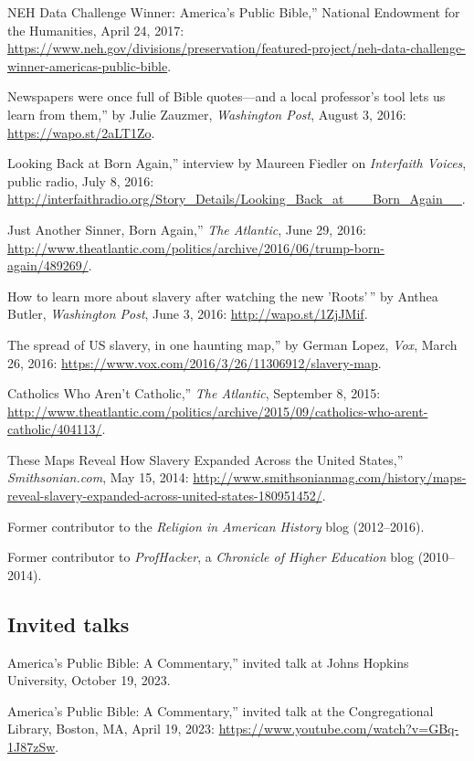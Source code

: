 \documentclass[11pt]{article}
\begin{document}
\noindent{}NEH Data Challenge Winner: America's Public Bible,'' National Endowment for the Humanities, April 24, 2017: \url{https://www.neh.gov/divisions/preservation/featured-project/neh-data-challenge-winner-americas-public-bible}.

\noindent{}Newspapers were once full of Bible quotes---and a local professor's tool lets us learn from them,'' by Julie Zauzmer, \emph{Washington Post}, August 3, 2016: \url{https://wapo.st/2aLT1Zo}.

\noindent{}Looking Back at Born Again,'' interview by Maureen Fiedler on \emph{Interfaith Voices}, public radio, July 8, 2016: \url{http://interfaithradio.org/Story_Details/Looking_Back_at___Born_Again__}.

\noindent{}Just Another Sinner, Born Again,'' \emph{The Atlantic}, June 29, 2016: \url{http://www.theatlantic.com/politics/archive/2016/06/trump-born-again/489269/}.

\noindent{}How to learn more about slavery after watching the new 'Roots'\,'' by Anthea Butler, \emph{Washington Post}, June 3, 2016: \url{http://wapo.st/1ZjJMif}.

\noindent{}The spread of US slavery, in one haunting map,'' by German Lopez, \emph{Vox}, March 26, 2016: \url{https://www.vox.com/2016/3/26/11306912/slavery-map}.

\noindent{}Catholics Who Aren't Catholic,'' \emph{The Atlantic}, September 8, 2015:  \url{http://www.theatlantic.com/politics/archive/2015/09/catholics-who-arent-catholic/404113/}.

\noindent{}These Maps Reveal How Slavery Expanded Across the United States,'' \emph{Smithsonian.com}, May 15, 2014: \url{http://www.smithsonianmag.com/history/maps-reveal-slavery-expanded-across-united-states-180951452/}.

Former contributor to the \emph{Religion in American History} blog (2012--2016).

Former contributor to \emph{ProfHacker}, a \emph{Chronicle of Higher Education} blog (2010--2014). 

\subsection{Invited talks}\label{Invited talks}

\noindent{}America's Public Bible: A Commentary,'' invited talk at Johns 
Hopkins University, October 19, 2023.

\noindent{}America's Public Bible: A Commentary,'' invited talk at the Congregational Library, Boston, MA, April 19, 2023: \url{https://www.youtube.com/watch?v=GBq-1J87zSw}.
\end{document}

